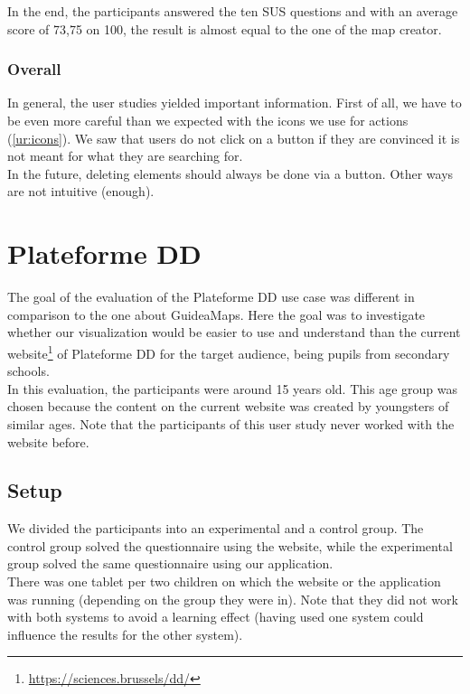 In the end, the participants answered the ten SUS questions and with an average score of 73,75 on 100, the result is almost equal to the one of the map creator.

\subsubsection{Overall}
In general, the user studies yielded important information. First of all, we have to be even more careful than we expected with the icons we use for actions (\ref{ur:icons}). We saw that users do not click on a button if they are convinced it is not meant for what they are searching for.\\

In the future, deleting elements should always be done via a button. Other ways are not intuitive (enough).




\section{Plateforme DD}
The goal of the evaluation of the Plateforme DD use case was different in comparison to the one about GuideaMaps. Here the goal was to investigate whether our visualization would be easier to use and understand than the current website\footnote{\url{https://sciences.brussels/dd/}} of Plateforme DD for the target audience, being pupils from secondary schools.\\

In this evaluation, the participants were around 15 years old. This age group was chosen because the content on the current website was created by youngsters of similar ages. Note that the participants of this user study never worked with the website before.

\subsection{Setup}
We divided the participants into an experimental and a control group. The control group solved the questionnaire using the website, while the experimental group solved the same questionnaire using our application.\\

There was one tablet per two children on which the website or the application was running (depending on the group they were in). Note that they did not work with both systems to avoid a learning effect (having used one system could influence the results for the other system). 

